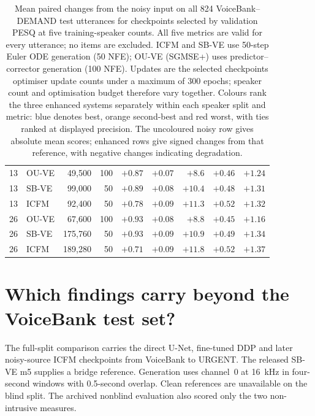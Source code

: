 \begin{table}[htbp]
{\begin{tabular}{rlrrrrrrr}
\midrule
13 & OU-VE & 49,500 & 100 & \cellcolor{secondorange}$+0.87$ & \cellcolor{worstred}$+0.07$ & \cellcolor{worstred}$+8.6$ & \cellcolor{worstred}$+0.46$ & \cellcolor{worstred}$+1.24$ \\
13 & SB-VE & 99,000 & 50 & \cellcolor{bestblue}$+0.89$ & \cellcolor{secondorange}$+0.08$ & \cellcolor{secondorange}$+10.4$ & \cellcolor{secondorange}$+0.48$ & \cellcolor{secondorange}$+1.31$ \\
13 & ICFM & 92,400 & 50 & \cellcolor{worstred}$+0.78$ & \cellcolor{bestblue}$+0.09$ & \cellcolor{bestblue}$+11.3$ & \cellcolor{bestblue}$+0.52$ & \cellcolor{bestblue}$+1.32$ \\
\midrule
26 & OU-VE & 67,600 & 100 & \cellcolor{bestblue}$+0.93$ & \cellcolor{worstred}$+0.08$ & \cellcolor{worstred}$+8.8$ & \cellcolor{worstred}$+0.45$ & \cellcolor{worstred}$+1.16$ \\
26 & SB-VE & 175,760 & 50 & \cellcolor{bestblue}$+0.93$ & \cellcolor{bestblue}$+0.09$ & \cellcolor{secondorange}$+10.9$ & \cellcolor{secondorange}$+0.49$ & \cellcolor{secondorange}$+1.34$ \\
26 & ICFM & 189,280 & 50 & \cellcolor{worstred}$+0.71$ & \cellcolor{bestblue}$+0.09$ & \cellcolor{bestblue}$+11.8$ & \cellcolor{bestblue}$+0.52$ & \cellcolor{bestblue}$+1.37$ \\
\bottomrule
\end{tabular}}
\caption{Mean paired changes from the noisy input on all 824 VoiceBank--DEMAND test utterances for checkpoints selected by validation PESQ at five training-speaker counts. All five metrics are valid for every utterance; no items are excluded. ICFM and SB-VE use 50-step Euler ODE generation (50 NFE); OU-VE (SGMSE+) uses predictor--corrector generation (100 NFE). Updates are the selected checkpoints\textquotesingle{} optimiser update counts under a maximum of 300 epochs; speaker count and optimisation budget therefore vary together. Colours rank the three enhanced systems separately within each speaker split and metric: blue denotes best, orange second-best and red worst, with ties ranked at displayed precision. The uncoloured noisy row gives absolute mean scores; enhanced rows give signed changes from that reference, with negative changes indicating degradation.}
\label{tab:vbdmd-speakers}
\end{table}

\section{Which findings carry beyond the VoiceBank test set?}
The full-split comparison carries the direct U-Net, fine-tuned \ac{DDP} and later noisy-source \ac{ICFM} checkpoints from VoiceBank to URGENT. The released \ac{SB-VE} m5 supplies a bridge reference. Generation uses channel~0 at 16~kHz in four-second windows with 0.5-second overlap. Clean references are unavailable on the blind split. The archived nonblind evaluation also scored only the two non-intrusive measures.

